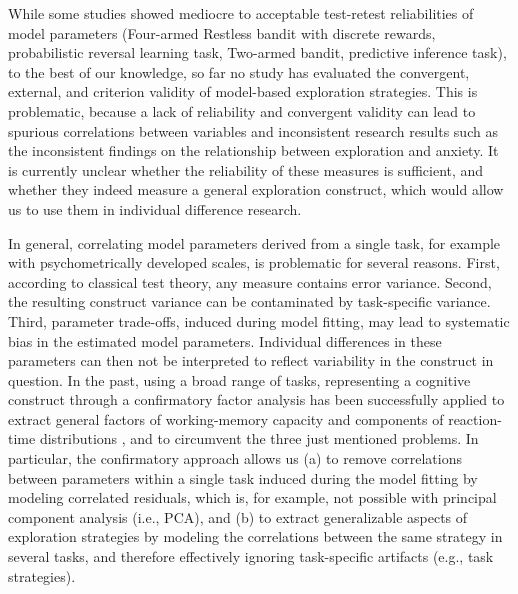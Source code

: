 \documentclass[fleqn,10pt]{wlscirep}
\begin{document}
While some studies showed mediocre to acceptable test-retest reliabilities of model parameters (Four-armed Restless bandit with discrete rewards\cite{mkrtchian_reliability_2023}, probabilistic reversal learning task\cite{waltmann_sufficient_2022}, Two-armed bandit\cite{schurr_dynamic_2024}, predictive inference task\cite{loosen2024consistency, vrizzi2023comparing}), to the best of our knowledge, so far no study has evaluated the convergent, external, and criterion validity of model-based exploration strategies. %
This is problematic, because a lack of reliability and convergent validity can lead to spurious correlations between variables and inconsistent research results such as the inconsistent findings on the relationship between exploration and anxiety\cite{fan_trait_2023, aberg_2022, dubois_2022, witte2024exploring, smith_lower_2022}. It is currently unclear whether the reliability of these measures is sufficient, and whether they indeed measure a general exploration construct, which would allow us to use them in individual difference research.

In general, correlating model parameters derived from a single task, for example with psychometrically developed scales, is problematic for several reasons. First, according to classical test theory, any measure contains error variance. Second, the resulting construct variance can be contaminated by task-specific variance\cite{sus_working-memory_2002}. Third, parameter trade-offs, induced during model fitting\cite{ratcliff_estimating_2002}, may lead to systematic bias in the estimated model parameters. Individual differences in these parameters can then not be interpreted to reflect variability in the construct in question. In the past, using a broad range of tasks, representing a cognitive construct through a confirmatory factor analysis has been successfully applied to extract general factors of working-memory capacity \cite{sus_working-memory_2002} and components of reaction-time distributions \cite{schmiedek_individual_2007}, and to circumvent the three just mentioned problems. In particular, the confirmatory approach allows us (a) to remove correlations between parameters within a single task induced during the model fitting by modeling correlated residuals, which is, for example, not possible with principal component analysis (i.e., PCA), and (b) to extract generalizable aspects of exploration strategies by modeling the correlations between the same strategy in several tasks, and therefore effectively ignoring task-specific artifacts (e.g., task strategies).
\end{document}
